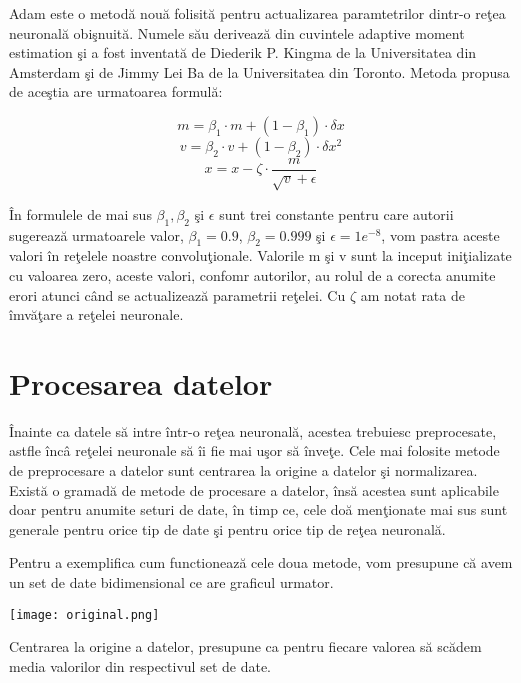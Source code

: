 Adam este o metod\u{a} nou\u{a} folisit\u{a} pentru actualizarea paramtetrilor dintr-o re\c{t}ea neuronal\u{a} obi\c{s}nuit\u{a}. Numele s\u{a}u deriveaz\u{a} din cuvintele adaptive moment estimation \c{s}i a fost inventat\u{a} de Diederik P. Kingma de la Universitatea din Amsterdam \c{s}i de Jimmy Lei Ba de la Universitatea din Toronto. Metoda propusa de ace\c{s}tia are urmatoarea formul\u{a}:

$$ m = \beta_1 \cdot m + ( 1 - \beta_1 ) \cdot \delta x $$
$$ v = \beta_2 \cdot v + ( 1- \beta_2 ) \cdot \delta x^2 $$
$$ x = x - \zeta \cdot \frac{m}{\sqrt{v} + \epsilon } $$

\^{I}n formulele de mai sus $\beta_1, \beta_2 $ \c{s}i $ \epsilon $ sunt trei constante pentru care autorii sugereaz\u{a} urmatoarele valor, $\beta_1 = 0.9 $, $\beta_2 = 0.999 $ \c{s}i $ \epsilon = 1e^{-8} $, vom pastra aceste valori \^{i}n re\c{t}elele noastre convolu\c{t}ionale. Valorile m \c{s}i v sunt la inceput ini\c{t}ializate cu valoarea zero, aceste valori, confomr autorilor, au rolul de a corecta anumite erori atunci c\^{a}nd se actualizeaz\u{a} parametrii re\c{t}elei. Cu $\zeta$ am notat rata de \^{i}mv\u{a}\c{t}are a re\c{t}elei neuronale.

\section{Procesarea datelor}

\^{I}nainte ca datele s\u{a} intre \^{i}ntr-o re\c{t}ea neuronal\u{a}, acestea trebuiesc preprocesate, astfle \^{i}nc\^{a} re\c{t}elei neuronale s\u{a} \^{i}i fie mai u\c{s}or s\u{a} \^{i}nve\c{t}e. Cele mai folosite metode de preprocesare a datelor sunt centrarea la origine a datelor \c{s}i normalizarea. Exist\u{a} o gramad\u{a} de metode de procesare a datelor, \^{i}ns\u{a} acestea sunt aplicabile doar pentru anumite seturi de date, \^{i}n timp ce, cele do\u{a} men\c{t}ionate mai sus sunt generale pentru orice tip de date \c{s}i pentru orice tip de re\c{t}ea neuronal\u{a}.

Pentru a exemplifica cum functioneaz\u{a} cele doua metode, vom presupune c\u{a} avem un set de date bidimensional ce are graficul urmator.

\begin{center}
\texttt{[image: original.png]}
\end{center}

Centrarea la origine a datelor, presupune ca pentru fiecare valorea s\u{a} sc\u{a}dem media valorilor din respectivul set de date.

